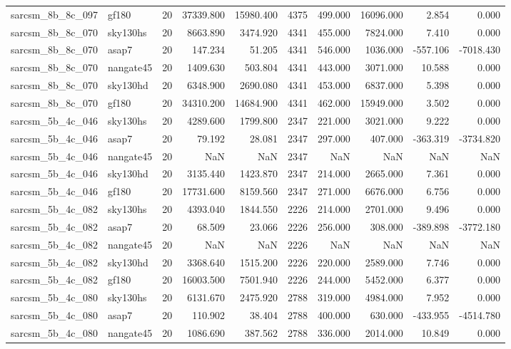 \begin{longtable}{llrrrrrrrr}
sarcsm\_8b\_8c\_097 & gf180 & 20 & 37339.800 & 15980.400 & 4375 & 499.000 & 16096.000 & 2.854 & 0.000 \\
sarcsm\_8b\_8c\_070 & sky130hs & 20 & 8663.890 & 3474.920 & 4341 & 455.000 & 7824.000 & 7.410 & 0.000 \\
sarcsm\_8b\_8c\_070 & asap7 & 20 & 147.234 & 51.205 & 4341 & 546.000 & 1036.000 & -557.106 & -7018.430 \\
sarcsm\_8b\_8c\_070 & nangate45 & 20 & 1409.630 & 503.804 & 4341 & 443.000 & 3071.000 & 10.588 & 0.000 \\
sarcsm\_8b\_8c\_070 & sky130hd & 20 & 6348.900 & 2690.080 & 4341 & 453.000 & 6837.000 & 5.398 & 0.000 \\
sarcsm\_8b\_8c\_070 & gf180 & 20 & 34310.200 & 14684.900 & 4341 & 462.000 & 15949.000 & 3.502 & 0.000 \\
sarcsm\_5b\_4c\_046 & sky130hs & 20 & 4289.600 & 1799.800 & 2347 & 221.000 & 3021.000 & 9.222 & 0.000 \\
sarcsm\_5b\_4c\_046 & asap7 & 20 & 79.192 & 28.081 & 2347 & 297.000 & 407.000 & -363.319 & -3734.820 \\
sarcsm\_5b\_4c\_046 & nangate45 & 20 & NaN & NaN & 2347 & NaN & NaN & NaN & NaN \\
sarcsm\_5b\_4c\_046 & sky130hd & 20 & 3135.440 & 1423.870 & 2347 & 214.000 & 2665.000 & 7.361 & 0.000 \\
sarcsm\_5b\_4c\_046 & gf180 & 20 & 17731.600 & 8159.560 & 2347 & 271.000 & 6676.000 & 6.756 & 0.000 \\
sarcsm\_5b\_4c\_082 & sky130hs & 20 & 4393.040 & 1844.550 & 2226 & 214.000 & 2701.000 & 9.496 & 0.000 \\
sarcsm\_5b\_4c\_082 & asap7 & 20 & 68.509 & 23.066 & 2226 & 256.000 & 308.000 & -389.898 & -3772.180 \\
sarcsm\_5b\_4c\_082 & nangate45 & 20 & NaN & NaN & 2226 & NaN & NaN & NaN & NaN \\
sarcsm\_5b\_4c\_082 & sky130hd & 20 & 3368.640 & 1515.200 & 2226 & 220.000 & 2589.000 & 7.746 & 0.000 \\
sarcsm\_5b\_4c\_082 & gf180 & 20 & 16003.500 & 7501.940 & 2226 & 244.000 & 5452.000 & 6.377 & 0.000 \\
sarcsm\_5b\_4c\_080 & sky130hs & 20 & 6131.670 & 2475.920 & 2788 & 319.000 & 4984.000 & 7.952 & 0.000 \\
sarcsm\_5b\_4c\_080 & asap7 & 20 & 110.902 & 38.404 & 2788 & 400.000 & 630.000 & -433.955 & -4514.780 \\
sarcsm\_5b\_4c\_080 & nangate45 & 20 & 1086.690 & 387.562 & 2788 & 336.000 & 2014.000 & 10.849 & 0.000 \\

\end{longtable}
